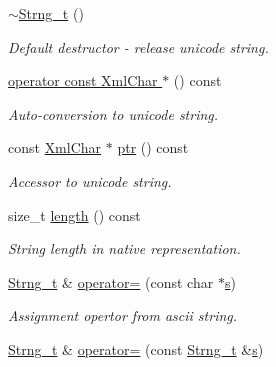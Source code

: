 \begin{DoxyCompactItemize}
\hyperlink{class_d_d4hep_1_1_x_m_l_1_1_strng__t_a0538fed420113f555a2f8ec389b131df}{$\sim$Strng\_\-t} ()
\begin{DoxyCompactList}\small\item\em Default destructor -\/ release unicode string. \item\end{DoxyCompactList}\item 
\hyperlink{class_d_d4hep_1_1_x_m_l_1_1_strng__t_a9621264c8adfc8db039b712c3508a08f}{operator const XmlChar $\ast$} () const 
\begin{DoxyCompactList}\small\item\em Auto-\/conversion to unicode string. \item\end{DoxyCompactList}\item 
const \hyperlink{namespace_d_d4hep_1_1_x_m_l_a09e5d9cc86ed782f6826dfe0778c1815}{XmlChar} $\ast$ \hyperlink{class_d_d4hep_1_1_x_m_l_1_1_strng__t_a41b088ad8a4ff8230158f3d529066262}{ptr} () const 
\begin{DoxyCompactList}\small\item\em Accessor to unicode string. \item\end{DoxyCompactList}\item 
size\_\-t \hyperlink{class_d_d4hep_1_1_x_m_l_1_1_strng__t_afd9aad27082a3bb52dac4a6cda2355f4}{length} () const 
\begin{DoxyCompactList}\small\item\em String length in native representation. \item\end{DoxyCompactList}\item 
\hyperlink{class_d_d4hep_1_1_x_m_l_1_1_strng__t}{Strng\_\-t} \& \hyperlink{class_d_d4hep_1_1_x_m_l_1_1_strng__t_a787c32e2ab4f24fff13bb8b9a059ca3c}{operator=} (const char $\ast$\hyperlink{_volumes_8cpp_a17ca6bfc8040d695d3cada22a4763d40}{s})
\begin{DoxyCompactList}\small\item\em Assignment opertor from ascii string. \item\end{DoxyCompactList}\item 
\hyperlink{class_d_d4hep_1_1_x_m_l_1_1_strng__t}{Strng\_\-t} \& \hyperlink{class_d_d4hep_1_1_x_m_l_1_1_strng__t_a27581bce0d2c52f93ca9cf5151779c5d}{operator=} (const \hyperlink{class_d_d4hep_1_1_x_m_l_1_1_strng__t}{Strng\_\-t} \&\hyperlink{_volumes_8cpp_a17ca6bfc8040d695d3cada22a4763d40}{s})

\end{DoxyCompactItemize}
